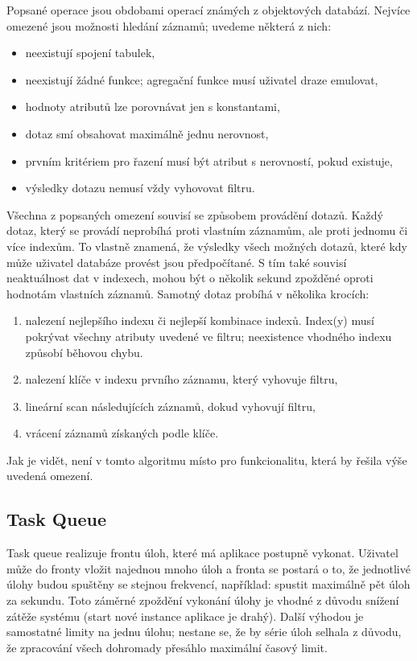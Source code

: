 Popsané operace jsou obdobami operací známých z objektových databází.
Nejvíce omezené jsou možnosti hledání záznamů; uvedeme některá z nich:
\begin{itemize}
	\item neexistují spojení tabulek,
	\item neexistují žádné funkce; agregační funkce musí uživatel draze emulovat,
	\item hodnoty atributů lze porovnávat jen s konstantami,
	\item dotaz smí obsahovat maximálně jednu nerovnost,
	\item prvním kritériem pro řazení musí být atribut s nerovností, pokud existuje,
	\item výsledky dotazu nemusí vždy vyhovovat filtru.
\end{itemize}

Všechna z popsaných omezení souvisí se způsobem provádění dotazů.
Každý dotaz, který se provádí neprobíhá proti vlastním záznamům, ale proti jednomu či více indexům.
To vlastně znamená, že výsledky všech možných dotazů, které kdy může uživatel databáze provést jsou předpočítané.
S tím také souvisí neaktuálnost dat v indexech, mohou být o několik sekund zpožděné oproti hodnotám vlastních záznamů.
Samotný dotaz probíhá v několika krocích:
\begin{enumerate}
	\item nalezení nejlepšího indexu či nejlepší kombinace indexů.
		Index(y) musí pokrývat všechny atributy uvedené ve filtru; neexistence vhodného indexu způsobí běhovou chybu.
	\item nalezení klíče v indexu prvního záznamu, který vyhovuje filtru,
	\item lineární scan následujících záznamů, dokud vyhovují filtru,
	\item vrácení záznamů získaných podle klíče.
\end{enumerate}

Jak je vidět, není v tomto algoritmu místo pro funkcionalitu, která by řešila výše uvedená omezení.

\subsection{Task Queue}

Task queue realizuje frontu úloh, které má aplikace postupně vykonat.
Uživatel může do fronty vložit najednou mnoho úloh a fronta se postará o to, že jednotlivé úlohy budou spuštěny se stejnou frekvencí, například: spustit maximálně pět úloh za sekundu.
Toto záměrné zpoždění vykonání úlohy je vhodné z důvodu snížení zátěže systému (start nové instance aplikace je drahý).
Další výhodou je samostatné limity na jednu úlohu; nestane se, že by série úloh selhala z důvodu, že zpracování všech dohromady přesáhlo maximální časový limit.


